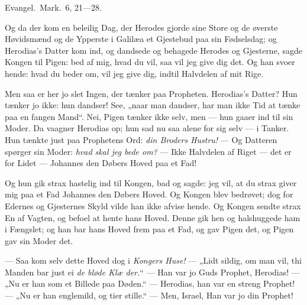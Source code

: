 \documentclass[12pt,a4paper]{book}
\begin{document}
Evangel.\ Mark.\ 6, 21---28.

\begingroup\large
Og da der kom en beleilig Dag, der Herodes gjorde sine Store og de øverste
Høvidsmænd og de Ypperste i Galilæa et Gjestebud paa sin Fødselsdag; og
Herodias's Datter kom ind, og dandsede og behagede Herodes og Gjesterne, sagde
Kongen til Pigen: bed af mig, hvad du vil, saa vil jeg give dig det. Og han svoer
hende: hvad du beder om, vil jeg give dig, indtil Halvdelen af mit Rige.
\par\endgroup

Men saa er her jo slet Ingen, der tænker paa Propheten. Herodias's Datter? Hun
tænker jo ikke: hun dandser! See, „naar man dandser, har man ikke Tid at tænke
paa en fangen Mand“. Nei, Pigen tænker ikke selv, men --- hun gaaer ind til sin
Moder. Da vaagner Herodias op; hun sad nu saa alene for sig selv --- i Tanker.
Hun tænkte just paa Prophetens Ord: \emph{din Broders Hustru!} --- Og Datteren
spørger sin Moder: \emph{hvad skal jeg bede om?} --- {\large Ikke Halvdelen af
Riget --- det er for Lidet --- Johannes den Døbers Hoved paa et Fad!}
\par{}

\begingroup\large
Og hun gik strax hastelig ind til Kongen, bad og sagde: jeg vil, at du strax
giver mig paa et Fad Johannes den Døbers Hoved. Og Kongen blev bedrøvet; dog for
Edernes og Gjesternes Skyld vilde han ikke afvise hende. Og Kongen sendte strax
En af Vagten, og befoel at hente hans Hoved. Denne gik hen og halshuggede ham i
Fængslet; og han bar hans Hoved frem paa et Fad, og gav Pigen det, og Pigen gav
sin Moder det.
\par\endgroup

--- Saa kom selv dette Hoved dog i \emph{Kongers Huse!} --- „Lidt sildig, om man
vil, thi Manden bar just ei \emph{de bløde Klæ\-%
der.}“ --- Han var jo Guds Prophet, Herodias! --- „Nu er han som et Billede paa
Døden.“ --- Herodias, han var en streng Prophet! --- „Nu er han englemild, og
tier stille.“ --- Men, Israel, Han var jo din Prophet!
\end{document}

